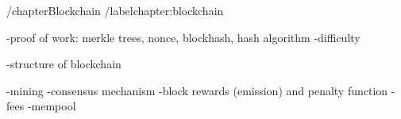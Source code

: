 /chapter{Blockchain}
/label{chapter:blockchain}





-proof of work: merkle trees, nonce, blockhash, hash algorithm
    -difficulty 
    
-structure of blockchain

-mining
    -consensus mechanism
    -block rewards (emission) and penalty function
    -fees
    -mempool

